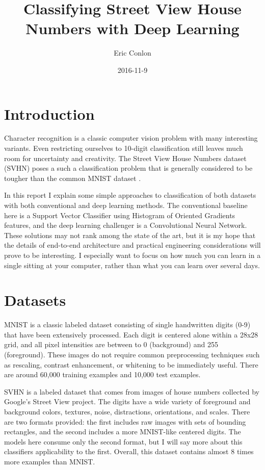 \documentclass{article}
\begin{document}
\author{Eric Conlon}
\title{Classifying Street View House Numbers with Deep Learning}
\date{2016-11-9}

\maketitle{} %

\tableofcontents{} %

\section{Introduction}

Character recognition is a classic computer vision problem with many interesting variants. Even restricting ourselves to 10-digit classification still leaves much room for uncertainty and creativity. The Street View House Numbers dataset (SVHN) \cite{netzer2011reading} poses a such a classification problem that is generally considered to be tougher than the common MNIST dataset \cite{lecun1998mnist}.

In this report I explain some simple approaches to classification of both datasets with both conventional and deep learning methods. The conventional baseline here is a Support Vector Classifier using Histogram of Oriented Gradients features, and the deep learning challenger is a Convolutional Neural Network. These solutions may not rank among the state of the art, but it is my hope that the details of end-to-end architecture and practical engineering considerations will prove to be interesting. I especially want to focus on how much you can learn in a single sitting at your computer, rather than what you can learn over several days.

\section{Datasets}

MNIST is a classic labeled dataset consisting of single handwritten digits (0-9) that have been extensively processed. Each digit is centered alone within a 28x28 grid, and all pixel intensities are between to 0 (background) and 255 (foreground). These images do not require common preprocessing techniques such as rescaling, contrast enhancement, or whitening to be immediately useful. There are around 60,000 training examples and 10,000 test examples.

SVHN is a labeled dataset that comes from images of house numbers collected by Google's Street View project. The digits have a wide variety of foreground and background colors, textures, noise, distractions, orientations, and scales. There are two formats provided: the first includes raw images with sets of bounding rectangles, and the second includes a more MNIST-like centered digits. The models here consume only the second format, but I will say more about this classifiers applicability to the first. Overall, this dataset contains almost 8 times more examples than MNIST.
\end{document}
